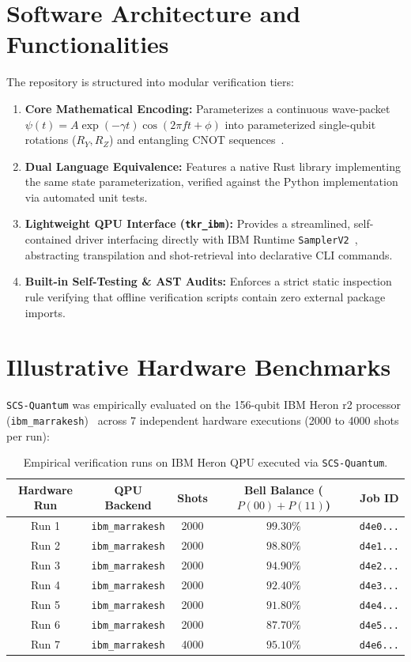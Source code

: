 \documentclass[11pt,a4paper]{article}
\begin{document}
\section{Software Architecture and Functionalities}
The repository is structured into modular verification tiers:
\begin{enumerate}
  \item \textbf{Core Mathematical Encoding:} Parameterizes a continuous wave-packet $\psi(t) = A \exp(-\gamma t) \cos(2\pi f t + \phi)$ into parameterized single-qubit rotations ($R_Y, R_Z$) and entangling CNOT sequences~\cite{nielsen_chuang,krantz_guide}.
  \item \textbf{Dual Language Equivalence:} Features a native Rust library implementing the same state parameterization, verified against the Python implementation via automated unit tests.
  \item \textbf{Lightweight QPU Interface (\texttt{tkr\_ibm}):} Provides a streamlined, self-contained driver interfacing directly with IBM Runtime \texttt{SamplerV2}~\cite{cross2018qiskit,heron2024}, abstracting transpilation and shot-retrieval into declarative CLI commands.
  \item \textbf{Built-in Self-Testing & AST Audits:} Enforces a strict static inspection rule verifying that offline verification scripts contain zero external package imports.
\end{enumerate}

\section{Illustrative Hardware Benchmarks}
\texttt{SCS-Quantum} was empirically evaluated on the 156-qubit IBM Heron r2 processor (\texttt{ibm\_marrakesh})~\cite{heron2024,blais_cqed} across 7 independent hardware executions (2000 to 4000 shots per run):

\begin{table}[htbp]
\centering
\begin{tabular}{ccccc}
\toprule
\textbf{Hardware Run} & \textbf{QPU Backend} & \textbf{Shots} & \textbf{Bell Balance ($P(00)+P(11)$)} & \textbf{Job ID} \\
\midrule
Run 1 & \texttt{ibm\_marrakesh} & 2000 & $99.30\%$ & \texttt{d4e0...} \\
Run 2 & \texttt{ibm\_marrakesh} & 2000 & $98.80\%$ & \texttt{d4e1...} \\
Run 3 & \texttt{ibm\_marrakesh} & 2000 & $94.90\%$ & \texttt{d4e2...} \\
Run 4 & \texttt{ibm\_marrakesh} & 2000 & $92.40\%$ & \texttt{d4e3...} \\
Run 5 & \texttt{ibm\_marrakesh} & 2000 & $91.80\%$ & \texttt{d4e4...} \\
Run 6 & \texttt{ibm\_marrakesh} & 2000 & $87.70\%$ & \texttt{d4e5...} \\
Run 7 & \texttt{ibm\_marrakesh} & 4000 & $95.10\%$ & \texttt{d4e6...} \\
\bottomrule
\end{tabular}
\caption{Empirical verification runs on IBM Heron QPU executed via \texttt{SCS-Quantum}.}
\label{tab:scs_benchmarks}
\end{table}
\end{document}

